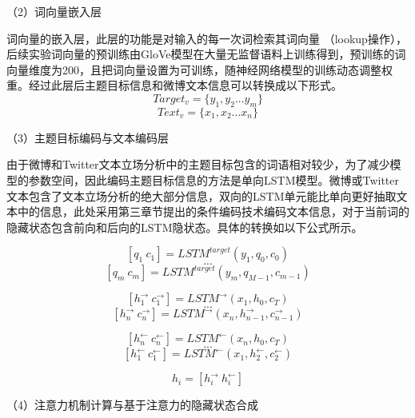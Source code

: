 （2）词向量嵌入层

词向量的嵌入层，此层的功能是对输入的每一次词检索其词向量 （lookup操作），后续实验词向量的预训练由GloVe模型在大量无监督语料上训练得到，预训练的词向量维度为200，且把词向量设置为可训练，随神经网络模型的训练动态调整权重。经过此层后主题目标信息和微博文本信息可以转换成以下形式。
\begin{equation}\label{target_info} Target_v= \lbrace y_1,y_2...y_m\rbrace \end{equation}
\begin{equation}\label{text_info} Text_v=\lbrace x_1,x_2...x_n\rbrace \end{equation}

（3）主题目标编码与文本编码层

由于微博和Twitter文本立场分析中的主题目标包含的词语相对较少，为了减少模型的参数空间，因此编码主题目标信息的方法是单向LSTM模型。微博或Twitter文本包含了文本立场分析的绝大部分信息，双向的LSTM单元能比单向更好抽取文本中的信息，此处采用第三章节提出的条件编码技术编码文本信息，对于当前词的隐藏状态包含前向和后向的LSTM隐状态。具体的转换如以下公式所示。


\begin{equation}\label{lstm_f}[q_1~c_1] = LSTM^{target}(y_1,q_0,c_0)\end{equation}
$$...$$
\begin{equation}\label{lstm_f}[q_m~c_m] = LSTM^{target}(y_m,q_{M-1},c_{m-1})\end{equation}

\begin{equation}\label{lstm_f}[h^{→}_{1}~c^{→}_{1}] = LSTM^{→}(x_1,h_0,c_T)\end{equation}
$$...$$
\begin{equation}\label{lstm_f}[h^{→}_{n}~c^{→}_{n}] = LSTM^{→}(x_n,h^{→}_{n-1},c^{→}_{n-1})\end{equation}

\begin{equation}\label{lstm_f}[h^{←}_{n}~c^{←}_{n}] = LSTM^{←}(x_n,h_0,c_T)\end{equation}
$$...$$
\begin{equation}\label{lstm_f}[h^{←}_{1}~c^{←}_{1}] = LSTM^{←}(x_1,h^{←}_{2},c^{←}_{2})\end{equation}

\begin{equation}\label{lstm_f}h_i= [h^{→}_i~h^{←}_i]\end{equation}

（4）注意力机制计算与基于注意力的隐藏状态合成

